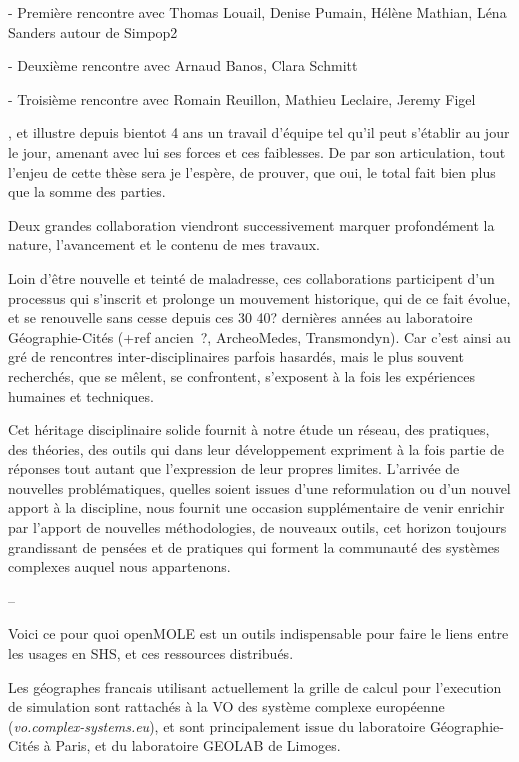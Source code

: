 - Première rencontre avec Thomas Louail, Denise Pumain, Hélène Mathian, Léna Sanders autour de Simpop2

- Deuxième rencontre avec Arnaud Banos, Clara Schmitt

- Troisième rencontre avec Romain Reuillon, Mathieu Leclaire, Jeremy Figel


 ,  et illustre depuis bientot 4 ans un travail d'équipe tel qu'il peut s'établir au jour le jour, amenant avec lui ses forces et ces faiblesses. De par son articulation, tout l'enjeu de cette thèse sera je l'espère, de prouver, que oui, le total fait bien plus que la somme des parties.

Deux grandes collaboration viendront successivement marquer profondément la nature, l'avancement et le contenu de mes travaux.


Loin d'être nouvelle et teinté de maladresse, ces collaborations participent d'un processus qui s'inscrit et prolonge un mouvement historique, qui de ce fait évolue, et se renouvelle sans cesse depuis ces 30 40? dernières années au laboratoire Géographie-Cités (+ref ancien ?, ArcheoMedes, Transmondyn). Car c'est ainsi  au gré de rencontres inter-disciplinaires parfois hasardés, mais le plus souvent recherchés, que se mêlent, se confrontent, s'exposent à la fois les expériences humaines et techniques.

Cet héritage disciplinaire solide fournit à notre étude un réseau, des pratiques, des théories, des outils  qui dans leur développement expriment à la fois partie de réponses tout autant que l'expression de leur propres limites. L'arrivée de nouvelles problématiques, quelles soient issues d'une reformulation ou d'un nouvel apport à la discipline, nous fournit une occasion supplémentaire de venir enrichir par l'apport de nouvelles méthodologies, de nouveaux outils, cet horizon toujours grandissant de pensées et de pratiques qui forment la communauté des systèmes complexes auquel nous appartenons.




--

Voici ce pour quoi openMOLE est un outils indispensable pour faire le liens entre les usages en SHS, et ces ressources distribués.

Les géographes francais utilisant actuellement la grille de calcul pour l'execution de simulation sont rattachés à la VO des système complexe européenne (\textit{vo.complex-systems.eu}), et sont principalement issue du laboratoire Géographie-Cités à Paris, et du laboratoire GEOLAB de Limoges.

